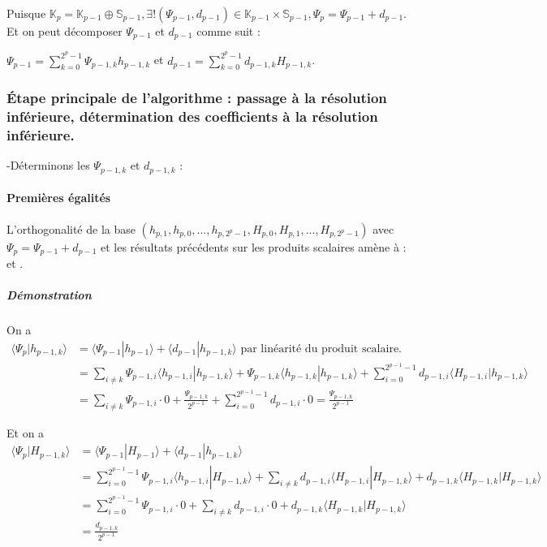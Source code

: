 \documentclass{article}
\begin{document}
Puisque $\mathbb{K}_{p} = \mathbb{K}_{p-1} \oplus \mathbb{S}_{p-1}, \exists{}!(\Psi{}_{p-1},d_{p-1}) \in \mathbb{K}_{p-1} \times \mathbb{S}_{p-1}, \Psi{}_p = \Psi{}_{p-1} + d_{p-1} $. \\

Et on peut décomposer $\Psi{}_{p-1}$ et $d_{p-1}$ comme suit :

$\displaystyle \Psi{}_{p-1} = \sum_{k=0}^{2^p - 1} \Psi{}_{p-1,k}h_{p-1,k}$ et $d_{p-1} =\displaystyle \sum_{k=0}^{2^p - 1} d_{p-1,k}H_{p-1,k}$. \\

\subsubsection{\uppercase{é}tape principale de l'algorithme : passage à la résolution inférieure, détermination des coefficients à la résolution inférieure.}

-Déterminons les $\Psi{}_{p-1,k}$ et $d_{p-1,k}$ :

\paragraph{Premières égalités}
L'orthogonalité de la base $(h_{p,1},h_{p,0},...,h_{p,2^p - 1},H_{p,0},H_{p,1},...,H_{p,2^p - 1})$ avec $\Psi{}_{p} = \Psi{}_{p-1} + d_{p-1}$ et les résultats précédents sur les produits scalaires amène à : et . \\

\subparagraph*{Démonstration} 

On a \begin{align*}
 \langle\Psi{}_{p}|h_{p-1,k} \rangle &= \langle \Psi{}_{p-1}|h_{p-1}\rangle + \langle d_{p-1}|h_{p-1,k} \rangle  \text{ par linéarité du produit scalaire.} \\
 &= \sum_{i \neq k} \Psi{}_{p-1,i} \langle h_{p-1,i}|h_{p-1,k} \rangle + \Psi{}_{p-1,k} \langle h_{p-1,k}|h_{p-1,k} \rangle + \sum_{i=0}^{2^{p-1} - 1} d_{p-1,i}\langle H_{p-1,i}|h_{p-1,k} \rangle  \\
 &= \sum_{i \neq k} \Psi{}_{p-1,i}\cdot{}0 + \frac{\Psi{}_{p-1,k}}{2^{p-1}} + \sum_{i=0}^{2^{p-1} - 1} d_{p-1,i}\cdot{}0 = \frac{\Psi{}_{p-1,k}}{2^{p-1}} 
 \end{align*}

Et on a 
\begin{align*} \displaystyle
 \langle\Psi{}_{p}|H_{p-1,k} \rangle &= \langle \Psi{}_{p-1}|H_{p-1}\rangle + \langle d_{p-1}|h_{p-1,k} \rangle  \\
&= \sum_{i=0}^{2^{p-1}-1} \Psi{}_{p-1,i}\langle h_{p-1,i}|H_{p-1,k}\rangle + \sum_{i \neq k}d_{p-1,i}\langle{}H_{p-1,i}|H_{p-1,k} \rangle + d_{p-1,k}\langle{}H_{p-1,k}|H_{p-1,k}\rangle  \\
&= \sum_{i=0}^{2^{p-1}-1}\Psi{}_{p-1,i}\cdot{}0 + \sum_{i \neq k}d_{p-1,i}\cdot{}0 + d_{p-1,k}\langle{}H_{p-1,k}|H_{p-1,k}\rangle \\ &= \frac{d_{p-1,k}}{2^{p-1}}
\end{align*} \\
\end{document}
